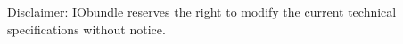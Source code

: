 %

\vspace*{0.5cm}
\noindent
\begin{scriptsize}
Disclaimer: IObundle reserves the right to modify the current
technical specifications without notice.
\end{scriptsize}
\newpage

